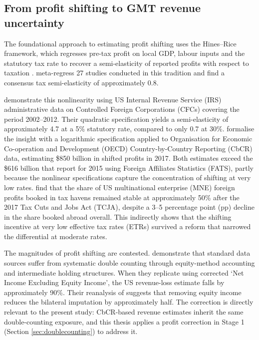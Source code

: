 \documentclass[11pt,a4paper]{article}
\begin{document}
\subsection{From profit shifting to GMT revenue uncertainty}\label{sec:beps}

The foundational approach to estimating profit shifting uses the Hines--Rice framework, which regresses pre-tax profit on local GDP, labour inputs and the statutory tax rate to recover a semi-elasticity of reported profits with respect to taxation \citep{hines1994}. \citet{heckemeyer2017} meta-regress 27 studies conducted in this tradition and find a consensus tax semi-elasticity of approximately 0.8. 

\citet{dowd2017} demonstrate this nonlinearity using US Internal Revenue Service (IRS) administrative data on Controlled Foreign Corporations (CFCs) covering the period 2002--2012. Their quadratic specification yields a semi-elasticity of approximately 4.7 at a 5\% statutory rate, compared to only 0.7 at 30\%. \citet{garcia-bernardo2024} formalise the insight with a logarithmic specification applied to Organisation for Economic Co-operation and Development (OECD) Country-by-Country Reporting (CbCR) data, estimating \$850 billion in shifted profits in 2017. Both estimates exceed the \$616 billion that \citet{torslov2023} report for 2015 using Foreign Affiliates Statistics (FATS), partly because the nonlinear specifications capture the concentration of shifting at very low rates. \citet{garcia-bernardo2022a} find that the share of US multinational enterprise (MNE) foreign profits booked in tax havens remained stable at approximately 50\% after the 2017 Tax Cuts and Jobs Act (TCJA), despite a 3--5 percentage point (pp) decline in the share booked abroad overall. This indirectly shows that the shifting incentive at very low effective tax rates (ETRs) survived a reform that narrowed the differential at moderate rates.

The magnitudes of profit shifting are contested. \citet{blouin2023} demonstrate that standard data sources suffer from systematic double counting through equity-method accounting and intermediate holding structures. When they replicate \citet{clausing2016} using corrected `Net Income Excluding Equity Income', the US revenue-loss estimate falls by approximately 90\%. Their reanalysis of \citet{torslov2023} suggests that removing equity income reduces the bilateral imputation by approximately half. The correction is directly relevant to the present study: CbCR-based revenue estimates inherit the same double-counting exposure, and this thesis applies a profit correction in Stage 1 (Section \ref{sec:doublecounting}) to address it.
\end{document}
